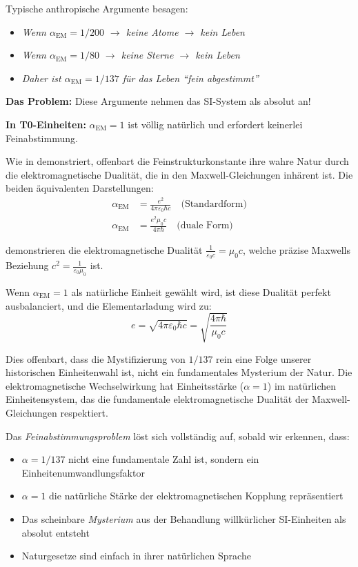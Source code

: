 \documentclass[12pt,a4paper]{article}
\begin{document}
	Typische anthropische Argumente besagen:
	\begin{itemize}
		\item \textit{Wenn $\alpha_{\text{EM}} = 1/200$ $\rightarrow$ keine Atome $\rightarrow$ kein Leben}
		\item \textit{Wenn $\alpha_{\text{EM}} = 1/80$ $\rightarrow$ keine Sterne $\rightarrow$ kein Leben}
		\item \textit{Daher ist $\alpha_{\text{EM}} = 1/137$ für das Leben \textquotedblleft fein abgestimmt\textquotedblright}
	\end{itemize}
	
	\textbf{Das Problem:} Diese Argumente nehmen das SI-System als absolut an!
	
	\textbf{In T0-Einheiten:} $\alpha_{\text{EM}} = 1$ ist völlig natürlich und erfordert keinerlei Feinabstimmung.
	
	Wie in \cite{pascher_feinstruktur_2025} demonstriert, offenbart die Feinstrukturkonstante ihre wahre Natur durch die elektromagnetische Dualität, die in den Maxwell-Gleichungen inhärent ist. Die beiden äquivalenten Darstellungen:
	\begin{align}
		\alpha_{\text{EM}} &= \frac{e^2}{4\pi\varepsilon_0\hbar c} \quad \text{(Standardform)}\\
		\alpha_{\text{EM}} &= \frac{e^2 \mu_0 c}{4\pi \hbar} \quad \text{(duale Form)}
	\end{align}
	
	demonstrieren die elektromagnetische Dualität $\frac{1}{\varepsilon_0 c} = \mu_0 c$, welche präzise Maxwells Beziehung $c^2 = \frac{1}{\varepsilon_0\mu_0}$ ist.
	
	Wenn $\alpha_{\text{EM}} = 1$ als natürliche Einheit gewählt wird, ist diese Dualität perfekt ausbalanciert, und die Elementarladung wird zu:
	$$e = \sqrt{4\pi\varepsilon_0\hbar c} = \sqrt{\frac{4\pi\hbar}{\mu_0 c}}$$
	
	Dies offenbart, dass die Mystifizierung von $1/137$ rein eine Folge unserer historischen Einheitenwahl ist, nicht ein fundamentales Mysterium der Natur. Die elektromagnetische Wechselwirkung hat Einheitsstärke ($\alpha = 1$) im natürlichen Einheitensystem, das die fundamentale elektromagnetische Dualität der Maxwell-Gleichungen respektiert.
	
	Das \textit{Feinabstimmungsproblem} löst sich vollständig auf, sobald wir erkennen, dass:
	\begin{itemize}
		\item $\alpha = 1/137$ nicht eine fundamentale Zahl ist, sondern ein Einheitenumwandlungsfaktor
		\item $\alpha = 1$ die natürliche Stärke der elektromagnetischen Kopplung repräsentiert
		\item Das scheinbare \textit{Mysterium} aus der Behandlung willkürlicher SI-Einheiten als absolut entsteht
		\item Naturgesetze sind einfach in ihrer natürlichen Sprache
	\end{itemize}
	
\end{document}
